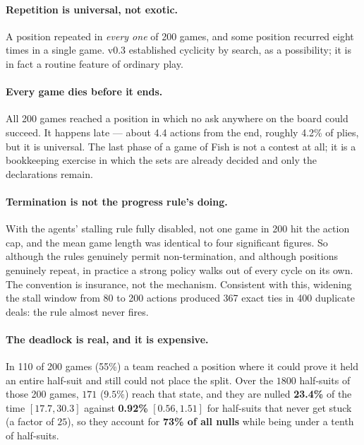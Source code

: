 \documentclass[11pt,letterpaper]{article}
\begin{document}
\paragraph{Repetition is universal, not exotic.} A position repeated in
\emph{every one} of 200 games, and some position recurred eight times in a
single game. v0.3 established cyclicity by search, as a possibility; it is in
fact a routine feature of ordinary play.

\paragraph{Every game dies before it ends.} All 200 games reached a position in
which no ask anywhere on the board could succeed. It happens late --- about 4.4
actions from the end, roughly 4.2\% of plies, but it is universal. The last
phase of a game of Fish is not a contest at all; it is a bookkeeping exercise in
which the sets are already decided and only the declarations remain.

\paragraph{Termination is not the progress rule's doing.} With the agents'
stalling rule fully disabled, not one game in 200 hit the action cap, and the
mean game length was identical to four significant figures. So although the
rules genuinely permit non-termination, and although positions genuinely repeat,
in practice a strong policy walks out of every cycle on its own. The convention
is insurance, not the mechanism. Consistent with this, widening the stall window
from 80 to 200 actions produced 367 exact ties in 400 duplicate deals: the rule
almost never fires.

\paragraph{The deadlock is real, and it is expensive.} In 110 of 200 games
(55\%) a team reached a position where it could prove it held an entire
half-suit and still could not place the split. Over the $1800$ half-suits of
those 200 games, $171$ ($9.5\%$) reach that state, and they are nulled
\textbf{23.4\%} of the time $[17.7, 30.3]$ against \textbf{0.92\%}
$[0.56, 1.51]$ for half-suits that never get stuck (a factor of $25$),
so they account for
\textbf{73\% of all nulls} while being under a tenth of half-suits.
\end{document}
